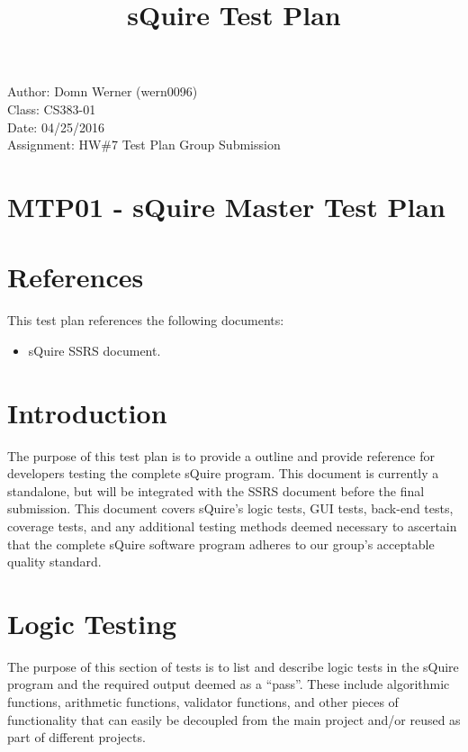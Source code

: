 \documentclass[14pt, a4paper]{article}
\begin{document}
\noindent Author: Domn Werner (wern0096) \\
Class: CS383-01 \\
Date: 04/25/2016 \\
Assignment: HW\#7 Test Plan Group Submission

\title{sQuire Test Plan}

\tableofcontents

\newpage

\section{MTP01 - sQuire Master Test Plan}

\section{References}

This test plan references the following documents:
\begin{itemize}
	\item sQuire SSRS document.
\end{itemize}

\section{Introduction}

The purpose of this test plan is to provide a outline and provide reference for developers testing the complete sQuire program. This document is currently a standalone, but will be integrated with the SSRS document before the final submission. This document covers sQuire's logic tests, GUI tests, back-end tests, coverage tests, and any additional testing methods deemed necessary to ascertain that the complete sQuire software program adheres to our group's acceptable quality standard.

\newpage

\section{Logic Testing}

The purpose of this section of tests is to list and describe logic tests in the sQuire program and the required output deemed as a ``pass''. These include algorithmic functions, arithmetic functions, validator functions, and other pieces of functionality that can easily be decoupled from the main project and/or reused as part of different projects.
\end{document}
